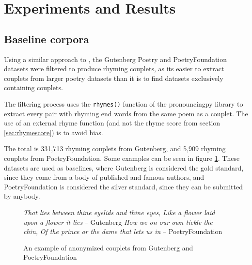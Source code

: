 \documentclass[11pt,a4paper]{article}
\begin{document}
\section{Experiments and Results}
\label{sec:results}

\subsection{Baseline corpora}
\label{sec:corpora}

Using a similar approach to \citet{cole}, the Gutenberg Poetry \cite{gutenbergpoetry} and PoetryFoundation \cite{poetryfoundationkaggle} datasets were filtered to produce rhyming couplets, as its easier to extract couplets from larger poetry datasets than it is to find datasets exclusively containing couplets.

The filtering process uses the \verb|rhymes()| function of the pronouncingpy library to extract every pair with rhyming end words from the same poem as a couplet. The use of an external rhyme function (and not the rhyme score from section \ref{sec:rhymescore}) is to avoid bias.

The total is 331,713 rhyming couplets from Gutenberg, and 5,909 rhyming couplets from PoetryFoundation. Some examples can be seen in figure \ref{fig:couplet_examples}. These datasets are used as baselines, where Gutenberg is considered the gold standard, since they come from a body of published and famous authors, and PoetryFoundation is considered the silver standard, since they can be submitted by anybody.

\begin{figure}
	\textit{That lies between thine eyelids and thine eyes,} \newline
	\textit{Like a flower laid upon a flower it lies} \newline
	-- Gutenberg
	\vspace{0.5em}
	\newline
	\textit{How we on our own tickle the chin,} \newline
	\textit{Of the prince or the dame that lets us in} \newline
	-- PoetryFoundation
\caption{An example of anonymized couplets from Gutenberg and PoetryFoundation}
\label{fig:couplet_examples}
\end{figure}
\end{document}
